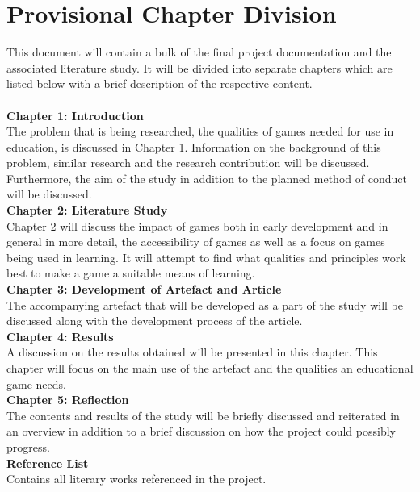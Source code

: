 \section{Provisional Chapter Division}
This document will contain a bulk of the final project documentation and the associated literature study. It will be divided into separate chapters which are listed below with a brief description of the respective content.
\\\\
\indent \textbf{Chapter 1: Introduction} \\	
The problem that is being researched, the qualities of games needed for use in education, is discussed in Chapter 1. Information on the background of this problem, similar research and the research contribution will be discussed. Furthermore, the aim of the study in addition to the planned method of conduct will be discussed.
\\
\indent \textbf{Chapter 2: Literature Study} \\
Chapter 2 will discuss the impact of games both in early development and in general in more detail, the accessibility of games as well as a focus on games being used in learning. It will attempt to find what qualities and principles work best to make a game a suitable means of learning.
\\
\indent \textbf{Chapter 3: Development of Artefact and Article} \\
The accompanying artefact that will be developed as a part of the study will be discussed along with the development process of the article.
\\
\indent \textbf{Chapter 4: Results} \\
A discussion on the results obtained will be presented in this chapter. This chapter will focus on the main use of the artefact and the qualities an educational game needs.
\\
\indent \textbf{Chapter 5: Reflection} \\
The contents and results of the study will be briefly discussed and reiterated in an overview in addition to a brief discussion on how the project could possibly progress.
\\
\indent \textbf{Reference List} \\
Contains all literary works referenced in the project.


